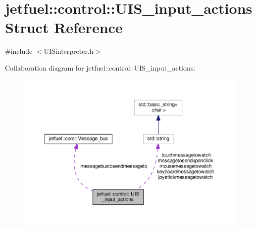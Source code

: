 \hypertarget{structjetfuel_1_1control_1_1UIS__input__actions}{}\section{jetfuel\+:\+:control\+:\+:U\+I\+S\+\_\+input\+\_\+actions Struct Reference}
\label{structjetfuel_1_1control_1_1UIS__input__actions}


{\ttfamily \#include $<$U\+I\+Sinterpreter.\+h$>$}



Collaboration diagram for jetfuel\+:\+:control\+:\+:U\+I\+S\+\_\+input\+\_\+actions\+:
\nopagebreak
\begin{figure}[H]
\begin{center}
\leavevmode
\includegraphics[width=350pt]{structjetfuel_1_1control_1_1UIS__input__actions__coll__graph}
\end{center}
\end{figure}
